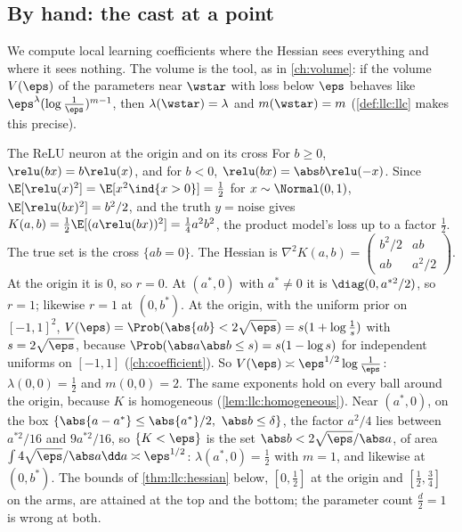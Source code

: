 \begin{refsection}
\section{By hand: the cast at a point}\label{sec:llc:byhand}

We compute local learning coefficients where the Hessian sees everything and where it sees nothing. The volume is the tool, as in \cref{ch:volume}: if the volume $V(\eps)$ of the parameters near $\wstar$ with loss below $\eps$ behaves like $\eps^\lambda(\log\frac1\eps)^{m-1}$, then $\lambda(\wstar)=\lambda$ and $m(\wstar)=m$ (\cref{def:llc:llc} makes this precise).

\begin{computation}{The ReLU neuron at the origin and on its cross}\label{comp:llc:relu}
\step For $b\ge0$, $\relu(bx)=b\relu(x)$, and for $b<0$, $\relu(bx)=\abs b\relu(-x)$. Since $\E[\relu(x)^2]=\E[x^2\ind\{x>0\}]=\tfrac12$ for $x\sim\Normal(0,1)$, $\E[\relu(bx)^2]=b^2/2$, and the truth $y=\text{noise}$ gives $K(a,b)=\tfrac12\E[(a\relu(bx))^2]=\tfrac14a^2b^2$, the product model's loss up to a factor $\tfrac12$. The true set is the cross $\{ab=0\}$.
\step The Hessian is $\nabla^2K(a,b)=\begin{pmatrix}b^2/2&ab\\ab&a^2/2\end{pmatrix}$. At the origin it is $0$, so $r=0$. At $(a^*,0)$ with $a^*\ne0$ it is $\diag(0,a^{*2}/2)$, so $r=1$; likewise $r=1$ at $(0,b^*)$.
\step At the origin, with the uniform prior on $[-1,1]^2$, $V(\eps)=\Prob(\abs{ab}<2\sqrt\eps)=s(1+\log\frac1s)$ with $s=2\sqrt\eps$, because $\Prob(\abs a\abs b\le s)=s(1-\log s)$ for independent uniforms on $[-1,1]$ (\cref{ch:coefficient}). So $V(\eps)\asymp\eps^{1/2}\log\frac1\eps$: $\lambda(0,0)=\tfrac12$ and $m(0,0)=2$. The same exponents hold on every ball around the origin, because $K$ is homogeneous (\cref{lem:llc:homogeneous}).
\step Near $(a^*,0)$, on the box $\{\abs{a-a^*}\le\abs{a^*}/2,\ \abs b\le\delta\}$, the factor $a^2/4$ lies between $a^{*2}/16$ and $9a^{*2}/16$, so $\{K<\eps\}$ is the set $\abs b<2\sqrt\eps/\abs a$, of area $\int4\sqrt\eps/\abs a\dd a\asymp\eps^{1/2}$: $\lambda(a^*,0)=\tfrac12$ with $m=1$, and likewise at $(0,b^*)$. The bounds of \cref{thm:llc:hessian} below, $[0,\tfrac12]$ at the origin and $[\tfrac12,\tfrac34]$ on the arms, are attained at the top and the bottom; the parameter count $\tfrac d2=1$ is wrong at both.
\end{computation}


\end{refsection}
